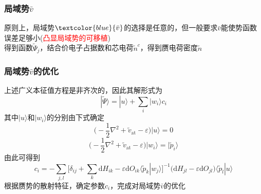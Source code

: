 \frame
{
	\frametitle{局域势$\bar v$}
	原则上，局域势$\textcolor{blue}{\bar v}$的选择是任意的，但一般要求$\bar v$能使势函数误差足够小(\textcolor{red}{凸显局域势的可移植})\\
	\fontsize{7.2pt}{5.2pt}
	得到函数$\tilde\Psi_j$，结合价电子占据数和芯电荷$\tilde n^c$，得到赝电荷密度$\tilde n$
}

\frame
{
	\frametitle{局域势$\bar v$的优化}
	上述广义本征值方程是非齐次的，因此其解形式为
	$$|\tilde\Psi\rangle=|u\rangle+\sum_i|w_i\rangle c_i$$
	其中$|u\rangle$和$|w_i\rangle$的分别由下式确定
	$$\big(-\frac12\nabla^2+\tilde v_{\mathrm{at}}-\varepsilon\big)|u\rangle=0$$
	$$\big(-\frac12\nabla^2+\tilde v_{\mathrm{at}}-\varepsilon\big)|w_i\rangle=|\tilde p_i\rangle$$
	由此可得到
	$$c_i=-\sum_{j,l}\bigg[\delta_{ij}+\sum_k\mathrm{d}H_{ik}-\varepsilon\mathrm{d}O_{ik}\langle\tilde p_k|w_j\rangle\bigg]^{-1}\big(\mathrm{d}H_{jl}-\varepsilon\mathrm{d}O_{jl}\big)\langle\tilde p_l|u\rangle$$
	根据赝势的散射特征，确定参数$c_i$，完成对局域势$\bar v$的优化
}

